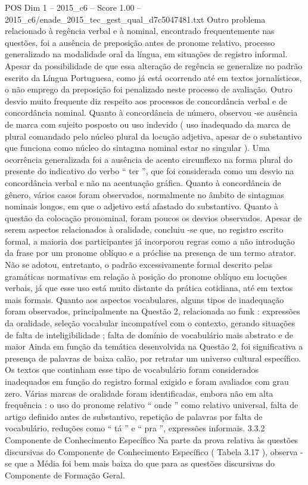 \begin{textsample}{POS Dim 1 – 2015\_c6 – Score 1.00 – 2015\_c6/enade\_2015\_tec\_gest\_qual\_d7c5047481.txt}
Outro problema relacionado à regência verbal e à nominal, encontrado frequentemente nas questões, foi a ausência de preposição antes de pronome relativo, processo generalizado na modalidade oral da língua, em situações de registro informal.
Apesar da possibilidade de que essa alteração de regência se generalize no padrão escrito da Língua Portuguesa, como já está ocorrendo até em textos jornalísticos, o não emprego da preposição foi penalizado neste processo de avaliação.
Outro desvio muito frequente diz respeito aos processos de concordância verbal e de concordância nominal.
Quanto à concordância de número, observou -se ausência de marca com sujeito posposto ou uso indevido ( uso inadequado da marca de plural comandado pelo núcleo plural da locução adjetiva, apesar de o substantivo que funciona como núcleo do sintagma nominal estar no singular ).
Uma ocorrência generalizada foi a ausência de acento circunflexo na forma plural do presente do indicativo do verbo “ ter ”, que foi considerada como um desvio na concordância verbal e não na acentuação gráfica.
Quanto à concordância de gênero, vários casos foram observados, normalmente no âmbito de sintagmas nominais longos, em que o adjetivo está afastado do substantivo.
Quanto à questão da colocação pronominal, foram poucos os desvios observados.
Apesar de serem aspectos relacionados à oralidade, concluiu -se que, no registro escrito formal, a maioria dos participantes já incorporou regras como a não introdução da frase por um pronome oblíquo e a próclise na presença de um termo atrator.
Não se adotou, entretanto, o padrão excessivamente formal descrito pelas gramáticas normativas em relação à posição do pronome oblíquo em locuções verbais, já que esse uso está muito distante da prática cotidiana, até em textos mais formais.
Quanto aos aspectos vocabulares, alguns tipos de inadequação foram observados, principalmente na Questão 2, relacionada ao funk : expressões da oralidade, seleção vocabular incompatível com o contexto, gerando situações de falta de inteligibilidade ; falta de domínio de vocabulário mais abstrato e de maior Ainda em função da temática desenvolvida na Questão 2, foi significativa a presença de palavras de baixa calão, por retratar um universo cultural específico.
Os textos que continham esse tipo de vocabulário foram considerados inadequados em função do registro formal exigido e foram avaliados com grau zero.
Várias marcas de oralidade foram identificadas, embora não em alta frequência : o uso do pronome relativo “ onde ” como relativo universal, falta de artigo definido antes de substantivo, repetição de palavras por falta de vocabulário, reduções como “ tá ” e “ pra ”, expressões informais. 3.3.2 Componente de Conhecimento Específico Na parte da prova relativa às questões discursivas do Componente de Conhecimento Específico ( Tabela 3.17 ), observa -se que a Média foi bem mais baixa do que para as questões discursivas do Componente de Formação Geral.

\end{textsample}
